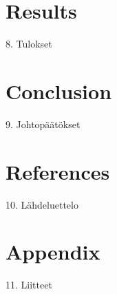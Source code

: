 \documentclass[12pt]{article}
\begin{document}
\section{Results}
8. Tulokset

\section{Conclusion}
9. Johtopäätökset

\section{References}
10. Lähdeluettelo

\section{Appendix}
11. Liitteet
\end{document}
